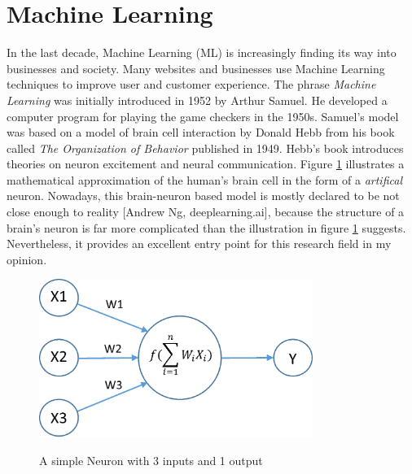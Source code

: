 \section{Machine Learning}
In the last decade, Machine Learning (ML) is increasingly finding its way into businesses and society. Many websites and businesses use Machine Learning techniques to improve user and customer experience. The phrase \textit{Machine Learning} was initially introduced in 1952 by Arthur Samuel. He developed a computer program for playing the game checkers in the 1950s. Samuel's model was based on a model of brain cell interaction by Donald Hebb from his book called \textit{The Organization of Behavior} published in 1949. Hebb's book introduces theories on neuron excitement and neural communication. Figure \ref{neuron} illustrates a mathematical approximation of the human's brain cell in the form of a \textit{artifical} neuron. Nowadays, this brain-neuron based model is mostly declared to be not close enough to reality [Andrew Ng, deeplearning.ai], because the structure of a brain's neuron is far more complicated than the illustration in figure \ref{neuron} suggests. Nevertheless, it provides an excellent entry point for this research field in my opinion. 

\begin{figure}
  \begin{center}
  \includegraphics[width=3.5in]{photos/neuron}\\
  \caption{A simple Neuron with 3 inputs and 1 output \cite{neuron}}\label{neuron}
  \end{center}
\end{figure}
 
